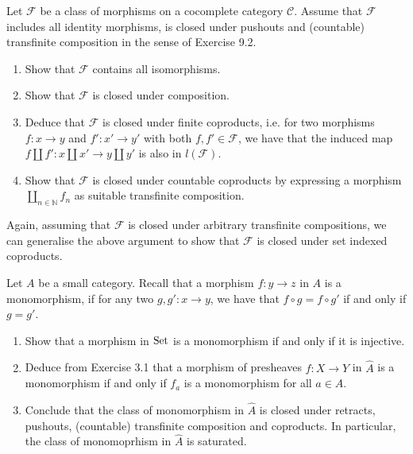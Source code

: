 \begin{Exercise}
    Let $ \mathcal{ F } $ be a class of morphisms on a cocomplete category $ \mathcal{ C } $.
    Assume that $ \mathcal{ F } $ includes all identity morphisms, is closed under pushouts and (countable) transfinite composition in the sense of Exercise 9.2.
    
    \begin{enumerate}[label=(\alph*)]
        \item 
        Show that $ \mathcal{ F } $ contains all isomorphisms.
    
        \item 
        Show that $ \mathcal{ F } $ is closed under composition.
    
        \item 
        Deduce that $ \mathcal{ F } $ is closed under finite coproducts, i.e. for two morphisms $ f : x  \to y $ and $ f' : x' \to y' $ with both $ f , f' \in \mathcal{ F } $, we have that the induced map $ f \amalg f' : x \amalg x' \to y \amalg y' $ is also in $ l ( \mathcal{ F } ) $.
    
        \item 
        Show that $ \mathcal{ F } $ is closed under countable coproducts by expressing a morphism $ \coprod_{ n \in \mathbb{ N } } f_n $ as suitable transfinite composition.
        
    \end{enumerate}
    
    Again, assuming that $ \mathcal{ F } $ is closed under arbitrary transfinite compositions, we can generalise the above argument to show that $ \mathcal{ F } $ is closed under set indexed coproducts.
\end{Exercise}

\begin{Exercise}
    Let $ A $ be a small category. 
    Recall that a morphism $ f : y \to z $ in $ A $ is a monomorphism, if for any two $ g , g' : x \to y $, we have that $ f \circ g = f \circ g' $ if and only if $ g = g' $.
    
    \begin{enumerate}[label=(\alph*)]
        \item 
        Show that a morphism in $ \operatorname{Set} $ is a monomorphism if and only if it is injective.
    
        \item 
        Deduce from Exercise 3.1 that a morphism of presheaves $ f : X \to Y $ in $ \widehat{ A } $ is a monomorphism if and only if $ f_a $ is a monomorphism for all $ a \in A $.
    
        \item 
        Conclude that the class of monomorphism in $ \widehat{ A } $ is closed under retracts, pushouts, (countable) transfinite composition and coproducts. In particular, the class of monomoprhism in $ \widehat{ A } $ is saturated.
    \end{enumerate}
\end{Exercise}
